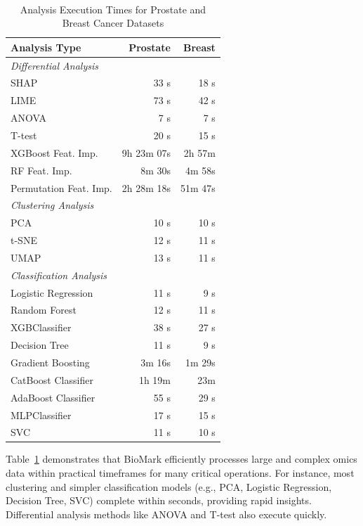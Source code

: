 \documentclass[journal]{IEEEtran}
\begin{document}
\begin{table}[htbp]
\centering
 \caption{Analysis Execution Times for Prostate and Breast Cancer Datasets}
\label{tab:analysis_times} 
\small
\begin{tabularx}{\columnwidth}{X r r}
\toprule
\textbf{Analysis Type} & \textbf{Prostate} & \textbf{Breast} \\
\midrule
\multicolumn{3}{l}{\textit{Differential Analysis}} \\
SHAP & 33 s & 18 s \\
LIME & 73 s & 42 s \\
ANOVA & 7 s & 7 s \\
T-test & 20 s & 15 s \\
XGBoost Feat. Imp. & 9h 23m 07s & 2h 57m \\
RF Feat. Imp. & 8m 30s & 4m 58s \\
Permutation Feat. Imp. & 2h 28m 18s & 51m 47s \\
\midrule
\multicolumn{3}{l}{\textit{Clustering Analysis}} \\
PCA & 10 s & 10 s \\
t-SNE & 12 s & 11 s \\
UMAP & 13 s & 11 s \\
\midrule
\multicolumn{3}{l}{\textit{Classification Analysis}} \\
Logistic Regression & 11 s & 9 s \\
Random Forest & 12 s & 11 s \\
XGBClassifier & 38 s & 27 s \\
Decision Tree & 11 s & 9 s \\
Gradient Boosting & 3m 16s & 1m 29s \\
CatBoost Classifier & 1h 19m & 23m \\
AdaBoost Classifier & 55 s & 29 s \\
MLPClassifier & 17 s & 15 s \\
SVC & 11 s & 10 s \\
\bottomrule
\end{tabularx}
\end{table}
Table~\ref{tab:analysis_times} demonstrates that BioMark efficiently processes large and complex omics data within practical timeframes for many critical operations. For instance, most clustering and simpler classification models (e.g., PCA, Logistic Regression, Decision Tree, SVC) complete within seconds, providing rapid insights. Differential analysis methods like ANOVA and T-test also execute quickly.
\end{document}
